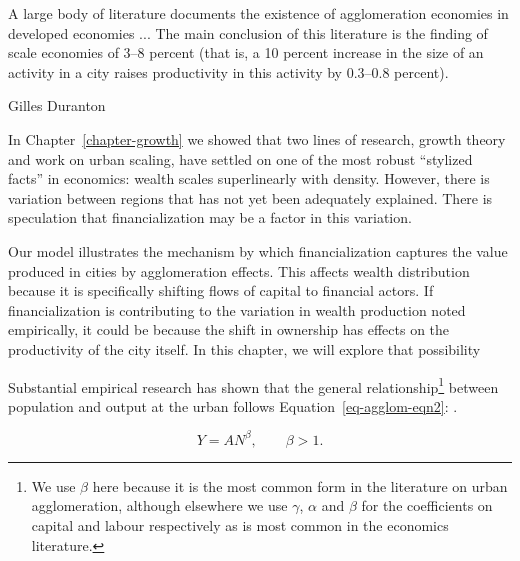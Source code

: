 \epigraph{A large body of literature documents the existence of agglomeration economies in developed economies ... The main conclusion of this literature is the finding of scale economies of 3--8 percent (that is, a 10 percent increase in the size of an activity in a city raises productivity in this activity by 0.3--0.8 percent).}{Gilles Duranton \cite{durantonAreCitiesEngines2009}} %





{\color{red} In Chapter~\ref{chapter-growth} we showed that two lines of research, growth theory and work on urban scaling, have settled on one of the most robust ``stylized facts'' in economics: wealth scales superlinearly with density. However, there is variation between regions that has not yet been adequately explained. There is speculation that financialization may be a factor in this variation. 

Our model illustrates the mechanism by which financialization captures the value produced in cities by agglomeration effects. This affects wealth distribution because it is specifically shifting flows of capital to financial actors. If financialization is contributing to the variation in wealth production noted empirically, it could be because the shift in ownership has effects on the productivity of the city itself. In this chapter, we will explore that possibility}

Substantial empirical research has shown that the general relationship\footnote{We use $\beta$ here because it is the most common form in the literature on urban agglomeration, although elsewhere we use $\gamma$, $\alpha$ and $\beta$ for the coefficients on capital and labour respectively as is most common in the economics literature.} between population and output at the urban %
follows Equation~\ref{eq-agglom-eqn2}: \cite{loboUrbanScalingProduction2013}.

\begin{equation}\label{eq-agglom-eqn2}
    Y=AN^\beta,\qquad \beta>1. 
\end{equation}


